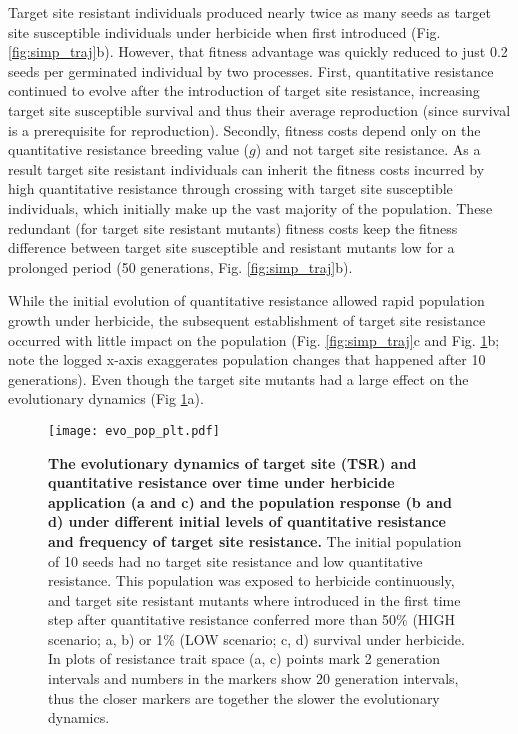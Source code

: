 \documentclass[10pt,letterpaper]{article}
\begin{document}
Target site resistant individuals produced nearly twice as many seeds as target site susceptible individuals under herbicide when first introduced (Fig. \ref{fig:simp_traj}b). However, that fitness advantage was quickly reduced to just 0.2 seeds per germinated individual by two processes. First, quantitative resistance continued to evolve after the introduction of target site resistance, increasing target site susceptible survival and thus their average reproduction (since survival is a prerequisite for reproduction). Secondly, fitness costs depend only on the quantitative resistance breeding value ($g$) and not target site resistance. As a result target site resistant individuals can inherit the fitness costs incurred by high quantitative resistance through crossing with target site susceptible individuals, which initially make up the vast majority of the population. These redundant (for target site resistant mutants) fitness costs keep the fitness difference between target site susceptible and resistant mutants low for a prolonged period (50 generations, Fig. \ref{fig:simp_traj}b). 

While the initial evolution of quantitative resistance allowed rapid population growth under herbicide, the subsequent establishment of target site resistance occurred with little impact on the population (Fig. \ref{fig:simp_traj}c and Fig. \ref{fig:evo_pop}b; note the logged x-axis exaggerates population changes that happened after 10 generations). Even though the target site mutants had a large effect on the evolutionary dynamics (Fig \ref{fig:evo_pop}a). 

\begin{figure}[!h] 
	\texttt{[image: evo\_pop\_plt.pdf]}
\caption{{\bf The evolutionary dynamics of target site (TSR) and quantitative resistance over time under herbicide application (a and c) and the population response (b and d) under different initial levels of quantitative resistance and frequency of target site resistance.} The initial population of 10 seeds had no target site resistance and low quantitative resistance. This population was exposed to herbicide continuously, and target site resistant mutants where introduced in the first time step after quantitative resistance conferred more than 50\% (HIGH scenario; a, b) or 1\% (LOW scenario; c, d) survival under herbicide. In plots of resistance trait space (a, c) points mark 2 generation intervals and numbers in the markers show 20 generation intervals, thus the closer markers are together the slower the evolutionary dynamics.} 
\label{fig:evo_pop}
\end{figure}
\end{document}
